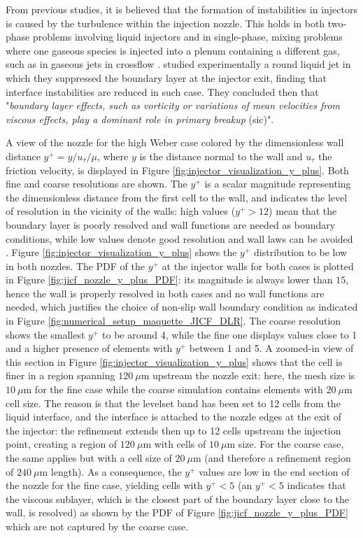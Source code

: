 From previous studies, it is believed that the formation of instabilities in injectors is caused by the turbulence within the injection nozzle. This holds in both two-phase problems involving liquid injectors 
and in single-phase, mixing problems where one gaseous species is injected into a plenum containing a different gas, such as in gaseous jets in crossflow . \citeColor[wu_effects_1994] studied experimentally a round liquid jet in which they suppressed the boundary layer at the injector exit, finding that interface instabilities are reduced in such case. They concluded then that "\textsl{boundary layer effects, such as vorticity or variations of mean velocities from viscous effects, play a dominant role in primary breakup} (sic)".

A view of the nozzle for the high Weber case colored by the dimensionless wall distance $y^+ = y / u_\tau / \mu$, where $y$ is the distance normal to the wall and $u_\tau$ the friction velocity, is displayed in Figure \ref{fig:injector_visualization_y_plus}. Both fine and coarse resolutions are shown. The $y^+$ is a scalar magnitude representing the dimensionless distance from the first cell to the wall, and indicates the level of resolution in the vicinity of the walls: high values ($y^+ > 12$) mean that the boundary layer is poorly resolved and wall functions are needed as boundary conditions, while low values denote good resolution and wall laws can be avoided . Figure \ref{fig:injector_visualization_y_plus} shows the $y^+$ distribution to be low in both nozzles. The PDF of the $y^+$ at the injector walls for both cases is plotted in Figure \ref{fig:jicf_nozzle_y_plus_PDF}: its magnitude is always lower than $15$, hence the wall is properly resolved in both cases and no wall functions are needed, which justifies the choice of non-slip wall boundary condition as indicated in Figure \ref{fig:numerical_setup_maquette_JICF_DLR}.  The coarse resolution shows the smallest $y^+$ to be around 4, while the fine one displays values close to 1 and a higher presence of elements with $y^+$ between 1 and 5. A zoomed-in view of this section in Figure \ref{fig:injector_visualization_y_plus} shows that the cell is finer in a region spanning $120~ \mu$m upstream the nozzle exit: here, the mesh size is $10~ \mu$m for the fine case while the coarse simulation contains elements with $20 ~\mu$m cell size. The reason is that the levelset band has been set to 12 cells from the liquid interface, and the interface is attached to the nozzle edges at the exit of the injector: the refinement extends then up to 12 cells upstream the injection point, creating a region of $120~\mu$m with cells of $10~\mu$m size. For the coarse case, the same applies but with a cell size of $20~\mu$m (and therefore a refinement region of $240~\mu$m length). As a consequence, the $y^+$ values are low in the end section of the nozzle for the fine case, yielding cells with $y^+ < 5$ (an $y^+ < 5$ indicates that the viscous sublayer, which is the closest part of the boundary layer close to the wall, is resolved) as shown by the PDF of Figure \ref{fig:jicf_nozzle_y_plus_PDF} which are not captured by the coarse case. 


